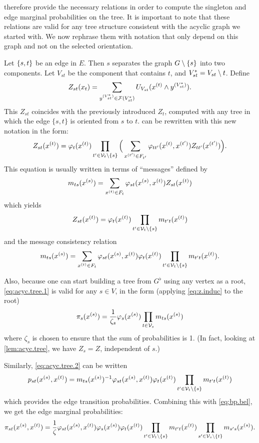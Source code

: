   therefore provide the necessary relations in order
to compute the singleton and edge marginal probabilities on the
tree. It is important to note that these relations are valid for any
tree structure consistent with the acyclic graph we started with. We
now rephrase them with notation that only depend on this graph and not
on the selected orientation.

Let $\left\{ s,t \right\}$ be an edge in $E$. Then $s$ separates the
graph $G\setminus\{s\}$ into two components. Let $V_{st}$ be the component
that contains $t$, and  $V_{st}^* = V_{st}\setminus t$. Define
$$
Z_{st}(x_t) = \sum_{y^{(V^*_{st})}\in {\mathcal F}(V^*_{st})} U_{V_{st}}(x^{(t)}\wedge y^{(V^*_{st})}).
$$
This $Z_{st}$ coincides with the previously introduced $Z_t$, computed with any tree
in which the edge $\{s,t\}$ is oriented from $s$ to $t$. 
 can be rewritten with this new notation in the form:
\begin{equation}
\label{eq:z.induc.2}
Z_{st}(x^{(t)}) =
\varphi_t(x^{(t)}) \prod_{t'\in {\mathcal V}_t\setminus \{s\}} \Big(\sum_{x^{(t')}\in F_{t'}} \varphi_{tt'}(x^{(t)}, x^{(t')}) Z_{tt'}(x^{(t')})\Big).
\end{equation}
This equation is usually written in terms of ``messages'' defined
by
$$
m_{ts}(x^{(s)}) = \sum_{x^{(t)}\in F_{t}} \varphi_{st}(x^{(s)}, x^{(t)}) Z_{st}(x^{(t)})
$$
which yields
$$
Z_{st}(x^{(t)}) = \varphi_t(x^{(t)}) \prod_{t'\in{\mathcal V}_t\setminus \{s\}} m_{t't}(x^{(t)})
$$
and the message consistency relation 
\begin{equation}
\label{eq:bp.mes}
m_{ts}(x^{(s)}) = \sum_{x^{(t)}\in F_{t}} \varphi_{st}(x^{(s)}, x^{(t)}) \varphi_t(x^{(t)}) \prod_{t'\in{\mathcal V}_t\setminus \{s\}} m_{t't}(x^{(t)}).
\end{equation}

Also, because one can start building a tree from $G^\flat$ using 
any vertex as a root,  \cref{eq:acyc.tree.1} is valid
for any $s\in V$, in the form (applying \cref{eq:z.induc} to the root)
\begin{equation}
\label{eq:bp.bel}
\pi_{s}(x^{(s)}) =\frac{1}{\zeta_s}  \varphi_s(x^{(s)}) \prod_{t\in {\mathcal V}_s} m_{ts}(x^{(s)})
\end{equation}
where $\zeta_s$ is chosen to ensure that the sum of probabilities is
1. (In fact, looking at  \cref{lem:acyc.tree}, we have $Z_s=Z$,
independent of $s$.)



Similarly,  \cref{eq:acyc.tree.2} can be written
\begin{equation}
\label{eq:bp.trans}
p_{st}(x^{(s)}, x^{(t)})  = m_{ts}(x^{(s)})^{-1}  \varphi_{st}(x^{(s)}, x^{(t)})
\varphi_t(x^{(t)}) \prod_{t'\in{\mathcal V}_t\setminus \{s\}} m_{t't}(x^{(t)})
\end{equation}
which provides the edge transition probabilities. Combining this with
\cref{eq:bp.bel}, we get the edge marginal probabilities:
\begin{equation}
\label{eq:bp.edge}
\pi_{st}(x^{(s)}, x^{(t)}) 
=  \frac{1}{\zeta} \varphi_{st}(x^{(s)}, x^{(t)}) \varphi_s(x^{(s)})
\varphi_t(x^{(t)}) \prod_{t'\in{\mathcal V}_t\setminus \{s\}} m_{t't}(x^{(t)}) \prod_{s'\in{\mathcal V}_s\setminus \{t\}} m_{s's}(x^{(s)}).
\end{equation}


